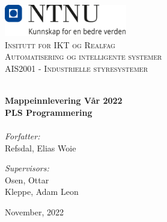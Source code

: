 
\begin{titlepage}
\vbox{ }
\vbox{ }
\begin{center}
\includegraphics[width=0.40\textwidth]{Images/NTNU_logo.png} \\[1cm]
\textsc{\LARGE Insitutt for IKT og Realfag}\\[1.5cm]
\textsc{\LARGE Automatisering og intelligente systemer}\\ [1.5cm]
\textsc{\Large AIS2001 - Industrielle styresystemer}\\[0.5cm]
\vbox{ }

\HRule \\[0.4cm]

{ \huge \bfseries Mappeinnlevering Vår 2022}\\[0.4cm]
{ \large \bfseries PLS Programmering}\\[0.4cm]
\HRule \\[1.5cm]

\large
\emph{Forfatter:}\\[0.2cm]
Refsdal, Elias Woie\\[0.1cm]
\vfill

\large
\emph{Supervisors:} \\ [0.2cm]
Osen, Ottar         \\ [0.1cm]
Kleppe, Adam Leon   \\ [0.1cm]
\vfill

{\large November, 2022}
\end{center}
\end{titlepage}